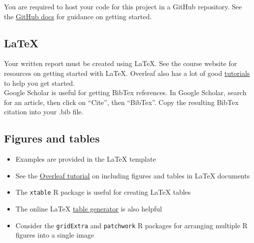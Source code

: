 \documentclass[11pt]{article}
\begin{document}
You are required to host your code for this project in a GitHub repository. See the \href{https://docs.github.com/en/get-started/quickstart/hello-world}{\underline{GitHub docs}} for guidance on getting started.

\subsection*{LaTeX}

Your written report must be created using LaTeX. See the course website for resources on getting started with LaTeX. Overleaf also has a lot of good \href{https://www.overleaf.com/learn/latex/Tutorials}{\underline{tutorials}} to help you get started.\\

\noindent Google Scholar is useful for getting BibTex references. In Google Scholar, search for an article, then click on ``Cite'', then ``BibTex''. Copy the resulting BibTex citation into your .bib file.

\subsection*{Figures and tables}

\begin{itemize}
\item Examples are provided in the LaTeX template
\item See the \href{https://www.overleaf.com/learn/latex/How_to_Write_a_Thesis_in_LaTeX_(Part_3)\%3A_Figures\%2C_Subfigures_and_Tables}{\underline{Overleaf tutorial}} on including figures and tables in LaTeX documents
\item The \verb;xtable; R package is useful for creating LaTeX tables
\item The online LaTeX \href{https://www.tablesgenerator.com/}{\underline{table generator}} is also helpful
\item Consider the \verb;gridExtra; and \verb;patchwork; R packages for arranging multiple R figures into a single image
\end{itemize}
\end{document}
